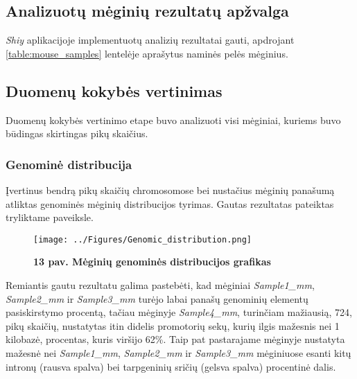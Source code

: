 \documentclass[12pt]{article}
\begin{document}
\newpage

\subsection{Analizuotų mėginių rezultatų apžvalga}
\emph{Shiy} aplikacijoje implementuotų analizių rezultatai gauti, apdrojant
\ref{table:mouse_samples} lentelėje aprašytus naminės pelės mėginius.

\subsection*{Duomenų kokybės vertinimas}
Duomenų kokybės vertinimo etape buvo analizuoti visi mėginiai, kuriems buvo
būdingas skirtingas pikų skaičius.

\subsubsection*{Genominė distribucija}
Įvertinus bendrą pikų skaičių chromosomose bei nustačius mėginių panašumą
atliktas genominės mėginių distribucijos tyrimas. Gautas rezultatas pateiktas
tryliktame paveiksle.

\begin{figure}[ht]
    \begin{center}
        \captionsetup{justification=centering}
        \texttt{[image: ../Figures/Genomic\_distribution.png]}
        \vspace{-1.5\baselineskip}
        \caption*{\small\textbf{13 pav. Mėginių genominės distribucijos
                                grafikas}}
    \end{center}
\end{figure}

Remiantis gautu rezultatu galima pastebėti, kad mėginiai \emph{Sample1\_mm},
\emph{Sample2\_mm} ir \emph{Sample3\_mm} turėjo labai panašų genominių elementų
pasiskirstymo procentą, tačiau mėginyje \emph{Sample4\_mm}, turinčiam mažiausią,
724, pikų skaičių, nustatytas itin didelis promotorių sekų, kurių ilgis mažesnis
nei 1 kilobazė, procentas, kuris viršijo 62\%. Taip pat pastarajame mėginyje
nustatyta mažesnė nei \emph{Sample1\_mm}, \emph{Sample2\_mm} ir
\emph{Sample3\_mm} mėginiuose esanti kitų intronų (rausva spalva) bei
tarpgeninių sričių (gelsva spalva) procentinė dalis.
\end{document}
